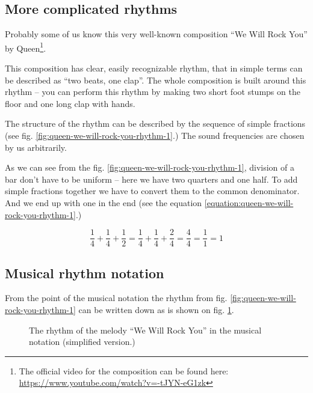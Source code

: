 \documentclass[../sparc.tex]{subfiles}
\begin{document}
\subsection{More complicated rhythms}

Probably some of us know this very well-known composition ``We Will Rock You''
by Queen\footnote{The official video for the composition can be found here:
\url{https://www.youtube.com/watch?v=-tJYN-eG1zk}}.

This composition has clear, easily recognizable rhythm, that in simple terms can
be described as ``two beats, one clap''.  The whole composition is built around
this rhythm -- you can perform this rhythm by making two short foot stumps on the
floor and one long clap with hands.


The structure of the rhythm can be described by the sequence of simple fractions
(see fig. \ref{fig:queen-we-will-rock-you-rhythm-1}.)  The sound frequencies are
chosen by us arbitrarily.

As we can see from the fig. \ref{fig:queen-we-will-rock-you-rhythm-1}, division
of a bar don't have to be uniform -- here we have two quarters and one half.  To
add simple fractions together we have to convert them to the common denominator.
And we end up with one in the end (see the equation
\ref{equation:queen-we-will-rock-you-rhythm-1}.)

\begin{equation}
  \frac{1}{4} + \frac{1}{4} + \frac{1}{2} = \frac{1}{4} + \frac{1}{4} + \frac{2}{4} = \frac{4}{4} = \frac{1}{1} = 1
  \label{equation:queen-we-will-rock-you-rhythm-1}
\end{equation}

\subsection{Musical rhythm notation}

From the point of the musical notation the rhythm from
fig. \ref{fig:queen-we-will-rock-you-rhythm-1} can be written down as is shown
on fig. \ref{fig:lilypond-queen-1}.

\begin{figure}[ht]
  \centering
  \caption{The rhythm of the melody ``We Will Rock You'' in the musical notation
    (simplified version.)}
  \label{fig:lilypond-queen-1}
\end{figure}
\end{document}
